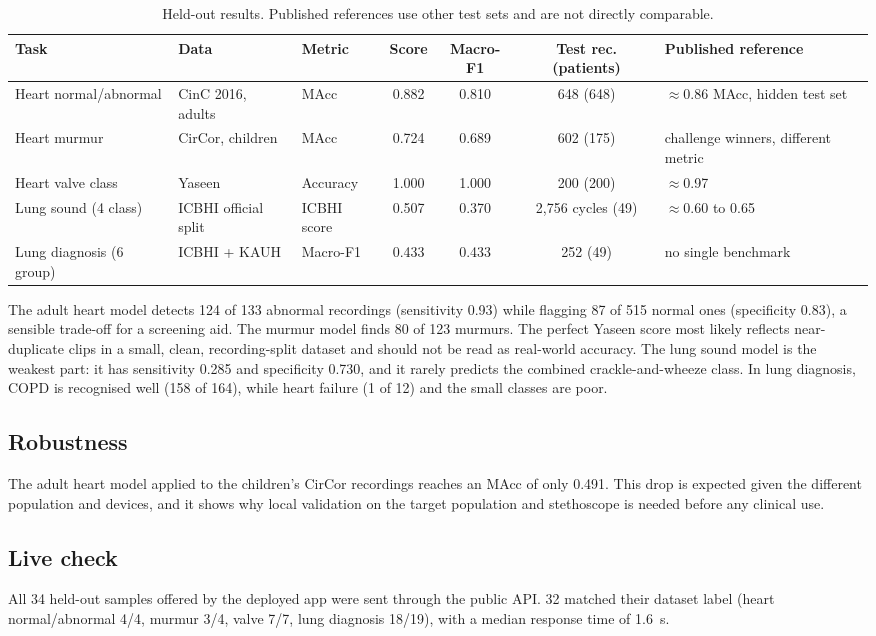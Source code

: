 \documentclass[conference]{IEEEtran}
\begin{document}
\begin{table}[t]
\caption{Held-out results. Published references use other test sets and are not directly comparable.}
\label{tab:results}
\centering
\footnotesize
\begin{tabular}{@{}lllcccl@{}}
\toprule
Task & Data & Metric & Score & Macro-F1 & Test rec. (patients) & Published reference \\
\midrule
Heart normal/abnormal & CinC 2016, adults & MAcc & 0.882 & 0.810 & 648 (648) & $\approx$0.86 MAcc, hidden test set \cite{potes2016} \\
Heart murmur & CirCor, children & MAcc & 0.724 & 0.689 & 602 (175) & challenge winners, different metric \cite{reyna2023} \\
Heart valve class & Yaseen & Accuracy & 1.000 & 1.000 & 200 (200) & $\approx$0.97 \cite{yaseen2018} \\
Lung sound (4 class) & ICBHI official split & ICBHI score & 0.507 & 0.370 & 2{,}756 cycles (49) & $\approx$0.60 to 0.65 \cite{bae2023} \\
Lung diagnosis (6 group) & ICBHI + KAUH & Macro-F1 & 0.433 & 0.433 & 252 (49) & no single benchmark \\
\bottomrule
\end{tabular}
\end{table}

The adult heart model detects 124 of 133 abnormal recordings (sensitivity 0.93) while flagging 87 of 515 normal ones (specificity 0.83), a sensible trade-off for a screening aid. The murmur model finds 80 of 123 murmurs. The perfect Yaseen score most likely reflects near-duplicate clips in a small, clean, recording-split dataset and should not be read as real-world accuracy. The lung sound model is the weakest part: it has sensitivity 0.285 and specificity 0.730, and it rarely predicts the combined crackle-and-wheeze class. In lung diagnosis, COPD is recognised well (158 of 164), while heart failure (1 of 12) and the small classes are poor.

\subsection{Robustness}
The adult heart model applied to the children's CirCor recordings reaches an MAcc of only 0.491. This drop is expected given the different population and devices, and it shows why local validation on the target population and stethoscope is needed before any clinical use.

\subsection{Live check}
All 34 held-out samples offered by the deployed app were sent through the public API. 32 matched their dataset label (heart normal/abnormal 4/4, murmur 3/4, valve 7/7, lung diagnosis 18/19), with a median response time of 1.6~s.
\end{document}
